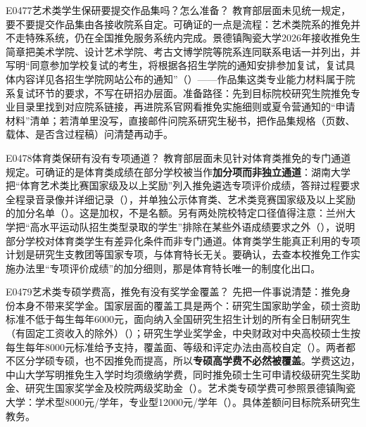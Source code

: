 \begin{qa}{E0477}{艺术类学生保研要提交作品集吗？怎么准备？}
教育部层面未见统一规定，要不要提交作品集由各接收院系自定。可确证的一点是流程：艺术类院系的推免并不走特殊系统，仍在全国推免服务系统内完成。景德镇陶瓷大学2026年接收推免生简章把美术学院、设计艺术学院、考古文博学院等院系连同联系电话一并列出，并写明“同意参加学校复试的考生，将根据各招生学院的通知安排参加复试，复试具体内容详见各招生学院网站公布的通知”（）——作品集这类专业能力材料属于院系复试环节的要求，不写在研招办层面。准备路径：先到目标院校研究生院推免专业目录里找到对应院系链接，再进院系官网看推免实施细则或夏令营通知的“申请材料”清单；若清单里没写，直接邮件问院系研究生秘书，把作品集规格（页数、载体、是否含过程稿）问清楚再动手。
\end{qa}

\begin{qa}{E0478}{体育类保研有没有专项通道？}
教育部层面未见针对体育类推免的专门通道规定。可确证的是体育类成绩在部分学校被当作\textbf{加分项而非独立通道}：湖南大学把“体育艺术类比赛国家级及以上奖励”列入推免遴选专项评价成绩，答辩过程要求全程录音录像并详细记录（），并单独公示体育类、艺术类竞赛国家级及以上奖励的加分名单（）。这是加权，不是名额。另有两处院校特定口径值得注意：兰州大学把“高水平运动队招生类型录取的学生”排除在某些外语成绩要求之外（），说明部分学校对体育类学生有差异化条件而非专门通道。体育类学生能真正利用的专项计划是研究生支教团等国家专项，与体育特长无关。要确认，去查本校推免工作实施办法里“专项评价成绩”的加分细则，那是体育特长唯一的制度化出口。
\end{qa}

\begin{qa}{E0479}{艺术类专硕学费高，推免有没有奖学金覆盖？}
先把一件事说清楚：推免身份本身不带来奖学金。国家层面的覆盖工具是两个：研究生国家助学金，硕士资助标准不低于每生每年6000元，面向纳入全国研究生招生计划的所有全日制研究生（有固定工资收入的除外）（）；研究生学业奖学金，中央财政对中央高校硕士生按每生每年8000元标准给予支持，覆盖面、等级和评定办法由高校自定（）。两者都不区分学硕专硕，也不因推免而提高，所以\textbf{专硕高学费不必然被覆盖}。学费这边，中山大学写明推免生入学时均须缴纳学费，同时推免硕士生可申请校级研究生奖助金、研究生国家奖学金及校院两级奖助金（）。艺术类专硕学费可参照景德镇陶瓷大学：学术型8000元/学年，专业型12000元/学年（）。具体差额问目标院系研究生教务。
\end{qa}

